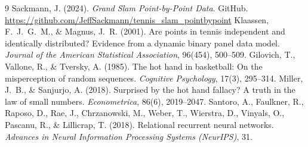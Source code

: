 \documentclass[10pt,a4paper]{article}
\begin{document}
\begin{thebibliography}{9}
\small
{} Sackmann, J. (2024). \emph{Grand Slam Point-by-Point Data}.
GitHub. \url{https://github.com/JeffSackmann/tennis_slam_pointbypoint}
 Klaassen, F.~J.~G.~M., \& Magnus, J.~R. (2001). Are points
in tennis independent and identically distributed? Evidence from a dynamic binary
panel data model. \emph{Journal of the American Statistical Association},
96(454), 500--509.
 Gilovich, T., Vallone, R., \& Tversky, A. (1985). The hot
hand in basketball: On the misperception of random sequences. \emph{Cognitive
Psychology}, 17(3), 295--314.
 Miller, J.~B., \& Sanjurjo, A. (2018). Surprised by the hot
hand fallacy? A truth in the law of small numbers. \emph{Econometrica}, 86(6),
2019--2047.
 Santoro, A., Faulkner, R., Raposo, D., Rae, J., Chrzanowski,
M., Weber, T., Wierstra, D., Vinyals, O., Pascanu, R., \& Lillicrap, T. (2018).
Relational recurrent neural networks. \emph{Advances in Neural Information
Processing Systems (NeurIPS)}, 31.
\end{thebibliography}
\end{document}

